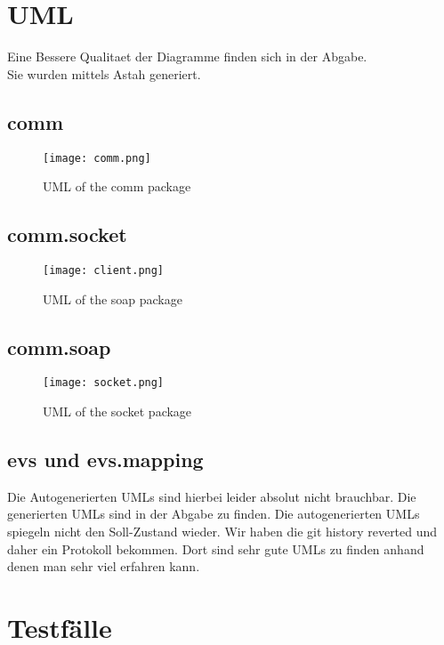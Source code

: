 \documentclass[a4paper]{article}
\begin{document}
\section{UML}
Eine Bessere Qualitaet der Diagramme finden sich in der Abgabe. \\ Sie wurden mittels Astah generiert. 
	\subsection{comm}
	\begin{figure}[here!]
	\centering
	\texttt{[image: comm.png]}
	\caption{UML of the comm package}
	\end{figure}
    \newpage
	\subsection{comm.socket}
	\begin{figure}[here!]
	\centering
	\texttt{[image: client.png]}
	\caption{UML of the soap package}
	\end{figure}
	\subsection{comm.soap}
	\begin{figure}[here!]
	\centering
	\texttt{[image: socket.png]}
	\caption{UML of the socket package}
	\end{figure}

\newpage
\subsection{evs und evs.mapping}
Die Autogenerierten UMLs sind hierbei leider absolut nicht brauchbar. Die generierten UMLs sind in der Abgabe zu finden. Die autogenerierten UMLs spiegeln nicht den Soll-Zustand wieder. Wir haben die git history reverted und daher ein Protokoll bekommen. Dort sind sehr gute UMLs zu finden anhand denen man sehr viel erfahren kann.  
\section{Testfälle}
\end{document}
